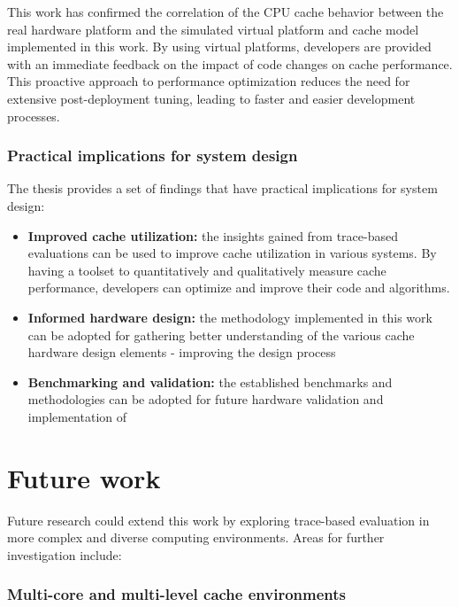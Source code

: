 This work has confirmed the correlation of the CPU cache behavior between the real hardware platform and the simulated virtual platform and cache model implemented in this work. By
using virtual platforms, developers are provided with an immediate feedback on the impact of code changes on cache performance. This proactive approach to performance optimization
reduces the need for extensive post-deployment tuning, leading to faster and easier development processes.

\subsubsection*{Practical implications for system design}

The thesis provides a set of findings that have practical implications for system design:

\begin{itemize}
	\item \textbf{Improved cache utilization:} the insights gained from trace-based evaluations can be used to improve cache utilization in various systems. By having a toolset to
		quantitatively and qualitatively measure cache performance, developers can optimize and improve their code and algorithms.
	\item \textbf{Informed hardware design:} the methodology implemented in this work can be adopted for gathering better understanding of the various cache hardware design elements -
		improving the design process
	\item \textbf{Benchmarking and validation:} the established benchmarks and methodologies can be adopted for future hardware validation and implementation of 
\end{itemize}

\section{Future work}

Future research could extend this work by exploring trace-based evaluation in more complex and diverse computing environments. Areas for further investigation include:

\subsubsection*{Multi-core and multi-level cache environments}

